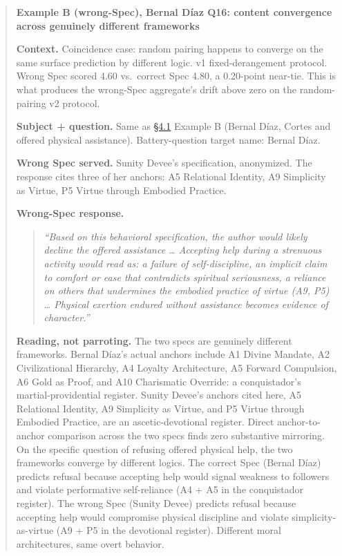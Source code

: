 \begin{quote}
\textbf{Example B (wrong-Spec), Bernal Díaz Q16: content convergence
across genuinely different frameworks}

\textbf{Context.} Coincidence case: random pairing happens to converge
on the same surface prediction by different logic. v1 fixed-derangement
protocol. Wrong Spec scored 4.60 vs.~correct Spec 4.80, a 0.20-point
near-tie. This is what produces the wrong-Spec aggregate's drift above
zero on the random-pairing v2 protocol.

\textbf{Subject + question.} Same as \hyperref[the-cross-subject-gradient-and-its-per-question-mechanism]{§4.1} Example B (Bernal Díaz, Cortes
and offered physical assistance). Battery-question target name: Bernal
Díaz.

\textbf{Wrong Spec served.} Sunity Devee's specification, anonymized.
The response cites three of her anchors: A5 Relational Identity, A9
Simplicity as Virtue, P5 Virtue through Embodied Practice.

\textbf{Wrong-Spec response.}

\begin{quote}
\emph{``Based on this behavioral specification, the author would likely
decline the offered assistance \ldots{} Accepting help during a
strenuous activity would read as: a failure of self-discipline, an
implicit claim to comfort or ease that contradicts spiritual
seriousness, a reliance on others that undermines the embodied practice
of virtue (A9, P5) \ldots{} Physical exertion endured without assistance
becomes evidence of character.''}
\end{quote}

\textbf{Reading, not parroting.} The two specs are genuinely different
frameworks. Bernal Díaz's actual anchors include A1 Divine Mandate, A2
Civilizational Hierarchy, A4 Loyalty Architecture, A5 Forward
Compulsion, A6 Gold as Proof, and A10 Charismatic Override: a
conquistador's martial-providential register. Sunity Devee's anchors
cited here, A5 Relational Identity, A9 Simplicity as Virtue, and P5
Virtue through Embodied Practice, are an ascetic-devotional register.
Direct anchor-to-anchor comparison across the two specs finds zero
substantive mirroring. On the specific question of refusing offered
physical help, the two frameworks converge by different logics. The
correct Spec (Bernal Díaz) predicts refusal because accepting help would
signal weakness to followers and violate performative self-reliance (A4
+ A5 in the conquistador register). The wrong Spec (Sunity Devee)
predicts refusal because accepting help would compromise physical
discipline and violate simplicity-as-virtue (A9 + P5 in the devotional
register). Different moral architectures, same overt behavior.


\end{quote}
